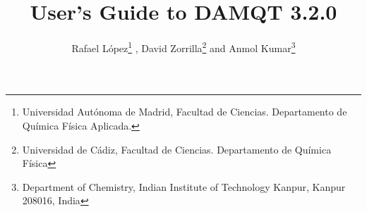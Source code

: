 \documentclass[10pt]{article}
\title{User's Guide to DAMQT 3.2.0}
\author{Rafael L\'opez\footnote{Universidad Aut\'onoma de
Madrid,
Facultad de Ciencias. Departamento de Qu\'{i}mica F\'{i}sica Aplicada.}{ },
David Zorrilla\footnote{Universidad de C\'adiz,
Facultad de Ciencias. Departamento de Qu\'{i}mica F\'{i}sica}
and
Anmol Kumar\footnote{Department of Chemistry, Indian Institute of Technology Kanpur, 
Kanpur 208016, India}}
\begin{document}
\renewcommand{\showlabelfont}{\small\slshape\color{red}}
\newcommand{\azul}[1]{{\color{blue}{#1}}}
\newcommand{\llaves}[1]{{\{#1\}}}
\newcommand{\be}{\begin{equation}}
\newcommand{\ee}{\end{equation}}
\newcommand{\ba}{\begin{array}}
\newcommand{\ea}{\end{array}}
\newcommand{\baa}{\begin{eqnarray}}
\newcommand{\eaa}{\end{eqnarray}}
\newcommand{\rne}{{\bf r}}
\newcommand{\Rne}{{\bf R}}
\newcommand{\Ene}{{\bf E}}
\newcommand{\Fne}{{\bf F}}
\newcommand{\Sne}{{\bf S}}
\newcommand{\Acal}{\mathscr{A}}
\newcommand{\Vcal}{\mathscr{V}}
\newcommand{\aux}{{\it .aux}}
\newcommand{\basis}{{\it .basis}}
\newcommand{\bmp}{{\it .bmp}}
\newcommand{\cam}{{\it .cam}}
\newcommand{\camdosD}{{\it .cam2D}}
\newcommand{\chk}{{\it .chk}}
\newcommand{\cnt}{{\it .cnt}}
\newcommand{\com}{{\it .com}}
\newcommand{\control}{{\it .control}}
\newcommand{\coords}{{\it .coords}}
\newcommand{\cplt}{{\it cxx-d.plt}}
\newcommand{\damproj}{{\it .damproj}}
\newcommand{\damqt}{{\it \_2016.damqt}}
\newcommand{\dmqtv}{{\it \_2016.dmqtv}}
\newcommand{\den}{{\it .den}}
\newcommand{\dengr}{{\it .dengr}}
\newcommand{\dengrdosD}{{\it .dengr2D}}
\newcommand{\dengz}{{\it .den.gz}}
\newcommand{\dplt}{{\it -d.pltd}}
\newcommand{\fcf}{{\it .fcf}}
\newcommand{\fchk}{{\it .fchk}}
\newcommand{\fnc}{{\it .fnc}}
\newcommand{\formchk}{{\it .formchk}}
\newcommand{\frad}{{\it .frad}}
\newcommand{\fre}{{\it .fre}}
\newcommand{\frgplt}{{\it frg-d.plt}}
\newcommand{\fri}{{\it .fri}}
\newcommand{\frt}{{\it .frt}}
\newcommand{\ggbs}{{\it .ggbs}}
\newcommand{\gnu}{{\it .gnu}}
\newcommand{\inp}{{\it .inp}}
\newcommand{\jpg}{{\it .jpg}}
\newcommand{\jpeg}{{\it .jpeg}}
\newcommand{\mkl}{{\it .mkl}}
\newcommand{\mos}{{\it .mos}}
\newcommand{\nwcout}{{\it .nwcout}}
\newcommand{\out}{{\it .out}}
\newcommand{\png}{{\it .png}}
\newcommand{\ppm}{{\it .ppm}}
\newcommand{\plt}{{\it .plt}}
\newcommand{\pltd}{{\it .pltd}}
\newcommand{\sgbs}{{\it .sgbs}}
\newcommand{\sgh}{{\it .sgh}}
\newcommand{\tiff}{{\it .tiff}}
\newcommand{\xml}{{\it .xml}}
\newcommand{\xpm}{{\it .xpm}}
\newcommand{\xbm}{{\it .xbm}}
\newcommand{\xyz}{{\it .xyz}}

\newcommand{\tttmake}{\texttt{make }}
\newcommand{\tttmakeinstall}{\texttt{make install }}
\newcommand{\tttconfigure}{\texttt{./configure }}
\newcommand{\tttshconfigure}{\texttt{sh ./configure }}
\end{document}
